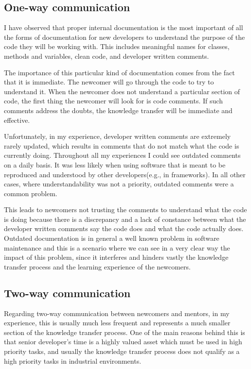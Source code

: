 \documentclass[12pt, letterpaper]{article}
\begin{document}
\subsection{One-way communication}
I have observed that proper internal documentation is the most 
important of all the forms of documentation for new developers to understand the purpose of the code they will
be working with. This includes meaningful names for classes, 
methods and variables, clean code, and developer written
comments.

The importance of this particular kind of documentation comes from the fact that it is immediate.
The newcomer will go through the code to try to understand it. When the newcomer does not understand 
a particular section of code, the first thing the newcomer will look for is code comments. 
If such comments address the doubts, the knowledge transfer will be immediate and effective.

Unfortunately, in my experience, developer written comments are extremely rarely updated, which results in 
comments that do not match what the code is currently doing. Throughout all my experiences 
I could see outdated comments on a daily basis. It was less likely when using software that is 
meant to be reproduced and understood by other developers(e.g., in frameworks). In all other cases,
where understandability was not a priority, outdated comments were a common problem.

This leads to newcomers not 
trusting the comments to understand what the code is doing because there is a discrepancy and a lack of 
constance between what the developer written comments say the code does and what the code actually does. 
Outdated documentation is in general a well known problem in software maintenance and this is a scenario
where we can see in a very clear way the impact of this problem, since it interferes and hinders vastly the 
knowledge transfer process and the learning experience of the newcomers.


\subsection{Two-way communication}
Regarding two-way communication between newcomers and mentors, in my experience, this is usually much less frequent and
represents a much smaller section of the knowledge transfer process. One of the main reasons behind this is that
senior developer's time is a highly valued asset which must be used in high priority tasks, and usually
the knowledge transfer process does not qualify as a high priority tasks in industrial environments. 
\end{document}
